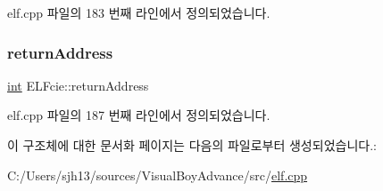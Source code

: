 elf.\+cpp 파일의 183 번째 라인에서 정의되었습니다.

\mbox{\label{struct_e_l_fcie_a5c87d6ce3906a0421f5815bda3520abf}} 
\subsubsection{\texorpdfstring{return\+Address}{returnAddress}}
{\footnotesize\ttfamily \mbox{\hyperlink{_util_8cpp_a0ef32aa8672df19503a49fab2d0c8071}{int}} E\+L\+Fcie\+::return\+Address}



elf.\+cpp 파일의 187 번째 라인에서 정의되었습니다.



이 구조체에 대한 문서화 페이지는 다음의 파일로부터 생성되었습니다.\+:\begin{DoxyCompactItemize}
\item 
C\+:/\+Users/sjh13/sources/\+Visual\+Boy\+Advance/src/\mbox{\hyperlink{elf_8cpp}{elf.\+cpp}}\end{DoxyCompactItemize}

